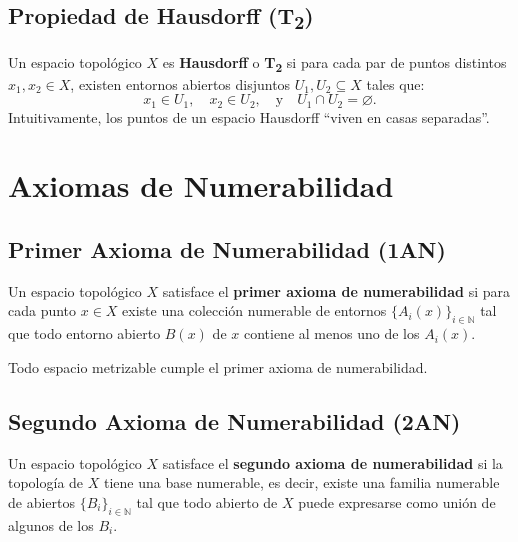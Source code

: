 \documentclass[12pt]{article}
\begin{document}
\subsection*{Propiedad de Hausdorff (T\textsubscript{2})}
\begin{tcolorbox}[definitionstyle]
Un espacio topológico \( X \) es \textbf{Hausdorff} o \textbf{T\textsubscript{2}} si para cada par de puntos distintos \( x_1, x_2 \in X \),  
existen entornos abiertos disjuntos \( U_1, U_2 \subseteq X \) tales que:
\[
x_1 \in U_1, \quad x_2 \in U_2, \quad \text{y} \quad U_1 \cap U_2 = \varnothing.
\]
Intuitivamente, los puntos de un espacio Hausdorff “viven en casas separadas”.
\end{tcolorbox}
\section*{Axiomas de Numerabilidad}
\subsection*{Primer Axioma de Numerabilidad (1AN)}
\begin{tcolorbox}[definitionstyle]
Un espacio topológico \( X \) satisface el \textbf{primer axioma de numerabilidad} si para cada punto \( x \in X \)  
existe una colección numerable de entornos \( \{A_i(x)\}_{i \in \mathbb{N}} \) tal que  
todo entorno abierto \( B(x) \) de \( x \) contiene al menos uno de los \( A_i(x) \).
 
Todo espacio metrizable cumple el primer axioma de numerabilidad.
\end{tcolorbox}
\subsection*{Segundo Axioma de Numerabilidad (2AN)}
\begin{tcolorbox}[definitionstyle]
Un espacio topológico \( X \) satisface el \textbf{segundo axioma de numerabilidad}  
si la topología de \( X \) tiene una base numerable, es decir,  
existe una familia numerable de abiertos \( \{B_i\}_{i \in \mathbb{N}} \) tal que  
todo abierto de \( X \) puede expresarse como unión de algunos de los \( B_i \).
\end{tcolorbox}
\end{document}
